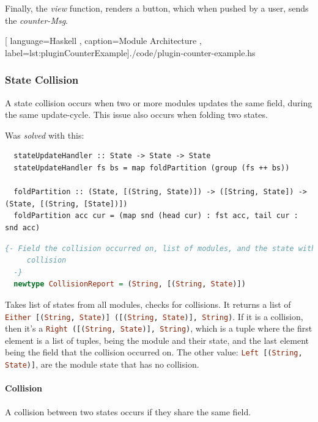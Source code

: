 Finally, the \textit{view} function, renders a button, which when pushed by a
user, sends the \textit{counter-Msg}.

\begin{center}
  
    [ language=Haskell
    , caption={Module Architecture}
    , label=lst:pluginCounterExample]{./code/plugin-counter-example.hs}
\end{center}

\subsubsection{State Collision}

A state collision occurs when two or more modules updates the same field, during
the same update-cycle. This issue also occurs when folding two states.

Was \textit{solved} with this:

\begin{verbatim}
  stateUpdateHandler :: State -> State -> State
  stateUpdateHandler fs bs = map foldPartition (group (fs ++ bs))

  foldPartition :: (State, [(String, State)]) -> ([String, State]) -> (State, [(String, [State])])
  foldPartition acc cur = (map snd (head cur) : fst acc, tail cur : snd acc)
\end{verbatim}


\begin{lstlisting}[language=Haskell]
  {- Field the collision occurred on, list of modules, and the state with the
     collision
  -}
  newtype CollisionReport = (String, [(String, State)])
\end{lstlisting}

Takes list of states from all modules, checks for collisions. It returns a
list of \lstinline[language=Haskell]{Either [(String, State)] ([(String, State)], String)}. If it is a
collision, then it's a \lstinline[language=Haskell]{Right ([(String, State)], String)}, which is a tuple
where the first element is a list of tuples, being the module and their
state, and the last element being the field that the collision occurred on.
The other value: \lstinline[language=Haskell]{Left [(String, State)]}, are the module state that has no
collision.

\paragraph{Collision} A collision between two states occurs if they share the same
field.

